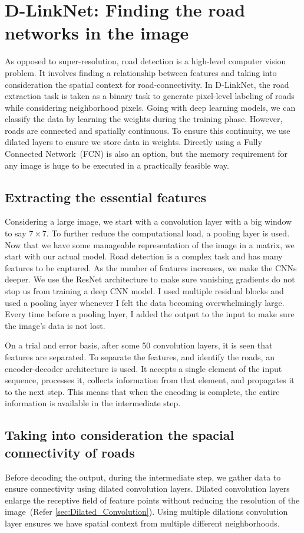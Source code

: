 \section{D-LinkNet: Finding the road networks in the image}
As opposed to super-resolution, road detection is a high-level computer vision problem. It involves finding a relationship between features and taking into consideration the spatial context for road-connectivity. In D-LinkNet, the road extraction task is taken as a binary task to generate pixel-level labeling of roads while considering neighborhood pixels. Going with deep learning models, we can classify the data by learning the weights during the training phase. However, roads are connected and spatially continuous. To ensure this continuity, we use dilated layers to ensure we store data in weights. Directly using a Fully Connected Network~(FCN) is also an option, but the memory requirement for any image is huge to be executed in a practically feasible way.

\subsection{Extracting the essential features}
Considering a large image, we start with a convolution layer with a big window to say $7\times7$. To further reduce the computational load, a pooling layer is used. Now that we have some manageable representation of the image in a matrix, we start with our actual model. Road detection is a complex task and has many features to be captured. As the number of features increases, we make the CNNs deeper. We use the ResNet architecture to make sure vanishing gradients do not stop us from training a deep CNN model. I used multiple residual blocks and used a pooling layer whenever I felt the data becoming overwhelmingly large. Every time before a pooling layer, I added the output to the input to make sure the image's data is not lost.

On a trial and error basis, after some 50 convolution layers, it is seen that features are separated. To separate the features, and identify the roads, an encoder-decoder architecture is used. It accepts a single element of the input sequence, processes it, collects information from that element, and propagates it to the next step. This means that when the encoding is complete, the entire information is available in the intermediate step.

\subsection{Taking into consideration the spacial connectivity of roads}
Before decoding the output, during the intermediate step, we gather data to ensure connectivity using dilated convolution layers. Dilated convolution layers enlarge the receptive field of feature points without reducing the resolution of the image~(Refer \cref{sec:Dilated_Convolution}). Using multiple dilations convolution layer ensures we have spatial context from multiple different neighborhoods.

